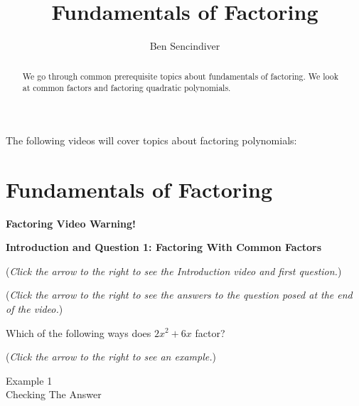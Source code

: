 \documentclass{ximera}
\title[Prerequisite Videos: ]{Fundamentals of Factoring}
\author{Ben Sencindiver}
\begin{document}
\begin{abstract}
  We go through common prerequisite topics about fundamentals of factoring. 
  We look at common factors and factoring quadratic polynomials.
\end{abstract}
\maketitle

The following videos will cover topics about factoring polynomials:

\section{Fundamentals of Factoring}
\textbf{Factoring Video Warning!}


\textbf{Introduction and Question 1: Factoring With Common Factors}
\begin{question}
\begin{flushright}
{\color{blue}(\emph{Click the arrow to the right to see the Introduction video and first question.})}
\end{flushright}
\begin{center}
\begin{expandable}
{\color{blue}(\emph{Click the arrow to the right to see the answers 
to the question posed at the end of the video.})}
\begin{expandable}
Which of the following ways does $2x^2 + 6x$ factor?
\begin{multipleChoice}
\end{multipleChoice}
\begin{flushright}
{\color{blue}(\emph{Click the arrow to the right to see an example.})}
\end{flushright}
\begin{expandable}
Example 1
\\

Checking The Answer
\end{expandable}
\end{expandable}
\end{expandable}
\end{center}
\end{question}
\end{document}
